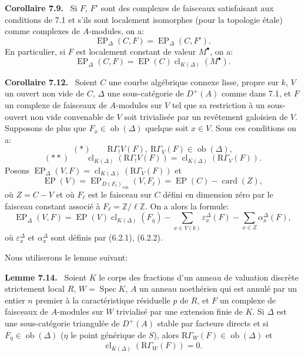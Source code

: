 \documentclass[11pt]{article}
\newenvironment{statement}[1]{\par\medskip\noindent\textbf{#1.}\ }{\par\medskip}
\DeclareMathOperator{\Spec}{Spec}
\providecommand{\EP}{\operatorname{EP}}
\providecommand{\coh}{\mathrm{coh}}
\providecommand{\Ob}{\operatorname{ob}}
\providecommand{\Ob}{\operatorname{ob}}
\providecommand{\Spec}{\operatorname{Spec}}
\providecommand{\EP}{\operatorname{EP}}
\providecommand{\Spec}{\operatorname{Spec}}
\providecommand{\Ob}{\operatorname{Ob}}
\providecommand{\coh}{\mathrm{coh}}
\providecommand{\clK}[1]{\operatorname{cl}_{K(#1)}}
\providecommand{\RG}{\mathrm R\Gamma}
\begin{document}
\begin{statement}{Corollaire 7.9}
Si $F$, $F'$ sont des complexes de faisceaux satisfaisant aux conditions de 7.1 et s'ils sont localement isomorphes (pour la topologie étale) comme complexes de $A$-modules, on a:
\[
\EP_\Delta(C,F)=\EP_\Delta(C,F').
\tag{7.10}
\]
En particulier, si $F$ est localement constant de valeur $M^\bullet$, on a:
\[
\EP_\Delta(C,F)=\EP(C)\clK{\Delta}(M^\bullet).
\tag{7.11}
\]
\end{statement}

\begin{statement}{Corollaire 7.12}
Soient $C$ une courbe algébrique connexe lisse, propre sur $k$, $V$ un ouvert non vide de $C$, $\Delta$ une sous-catégorie de $D^+(A)$ comme dans 7.1, et $F$ un complexe de faisceaux de $A$-modules sur $V$ tel que sa restriction à un sous-ouvert non vide convenable de $V$ soit trivialisée par un revêtement galoisien de $V$. Supposons de plus que $F_{\bar x}\in\Ob(\Delta)$ quelque soit $x\in V$. Sous ces conditions on a:
\[
(*)\qquad \RG_!V(F),\ \RG_V(F)\in\Ob(\Delta),
\]
\[
(**)\qquad
\clK{\Delta}(\RG_!V(F))=\clK{\Delta}(\RG_V(F)).
\]
Posons $\EP_\Delta(V,F)=\clK{\Delta}(\RG_V(F))$ et
\[
\EP(V)=\EP_{D(F_\ell)_{\coh}}(V,F_\ell)=\EP(C)-\operatorname{card}(Z),
\]
où $Z=C-V$ et où $F_\ell$ est le faisceau sur $C$ défini en dimension zéro par le faisceau constant associé à $F_\ell=\mathbb Z/\ell\mathbb Z$. On a alors la formule:
\[
\EP_\Delta(V,F)
=
\EP(V)\clK{\Delta}(F_{\bar\eta})
-\sum_{x\in V(k)}\varepsilon_x^\Delta(F)
-\sum_{x\in Z}\alpha_x^\Delta(F),
\tag{7.13}
\]
où $\varepsilon_x^\Delta$ et $\alpha_x^\Delta$ sont définis par (6.2.1), (6.2.2).
\end{statement}

Nous utiliserons le lemme suivant:

\begin{statement}{Lemme 7.14}
Soient $K$ le corps des fractions d'un anneau de valuation discrète strictement local $R$, $W=\Spec K$, $A$ un anneau noethérien qui est annulé par un entier $n$ premier à la caractéristique résiduelle $p$ de $R$, et $F$ un complexe de faisceaux de $A$-modules sur $W$ trivialisé par une extension finie de $K$. Si $\Delta$ est une sous-catégorie triangulée de $D^+(A)$ stable par facteurs directs et si $F_{\bar\eta}\in\Ob(\Delta)$ ($\eta$ le point générique de $S$), alors $\RG_W(F)\in\Ob(\Delta)$ et
\[
\clK{\Delta}(\RG_W(F))=0.
\]
\end{statement}
\end{document}
